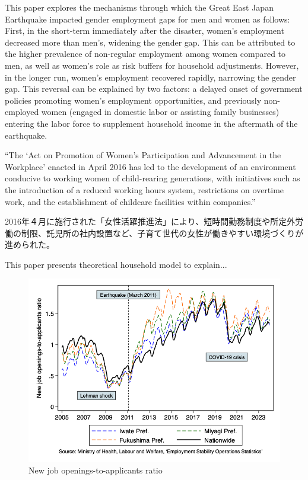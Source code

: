 \documentclass[12pt,halfline,a4paper]{ouparticle}
\begin{document}
This paper explores the mechanisms through which the Great East Japan Earthquake impacted gender employment gaps for men and women as follows: First, in the short-term immediately after the disaster, women's employment decreased more than men's, widening the gender gap. This can be attributed to the higher prevalence of non-regular employment among women compared to men, as well as women's role as risk buffers for household adjustments. However, in the longer run, women's employment recovered rapidly, narrowing the gender gap. This reversal can be explained by two factors: a delayed onset of government policies promoting women's employment opportunities, and previously non-employed women (engaged in domestic labor or assisting family businesses) entering the labor force to supplement household income in the aftermath of the earthquake.


“The ‘Act on Promotion of Women’s Participation and Advancement in the Workplace’ enacted in April 2016 has led to the development of an environment conducive to working women of child-rearing generations, with initiatives such as the introduction of a reduced working hours system, restrictions on overtime work, and the establishment of childcare facilities within companies.”


2016年４月に施行された「女性活躍推進法」により、短時間勤務制度や所定外労働の制限、託児所の社内設置など、子育て世代の女性が働きやすい環境づくりが進められた。

This paper presents theoretical household model to explain...




\begin{figure}
\includegraphics[width=\textwidth]{New job openings-to-applicants ratio.png}
\caption{New job openings-to-applicants ratio} \label{New job openings-to-applicants ratio.png}
\end{figure}
\end{document}
